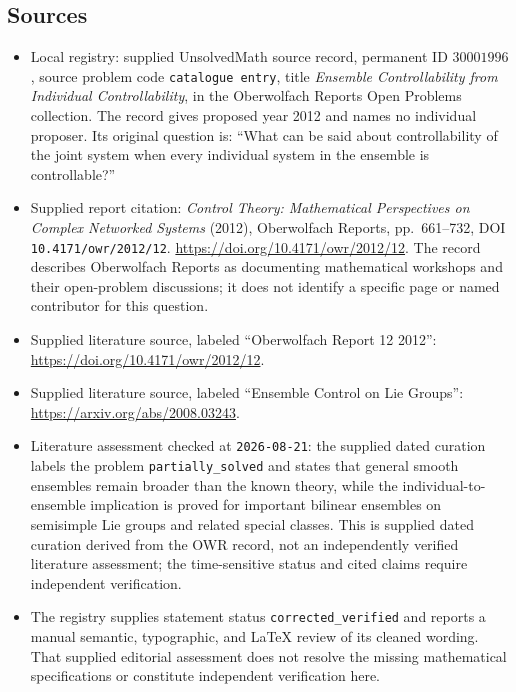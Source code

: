\documentclass[11pt]{article}
\begin{document}
\subsection{Sources}
\begin{itemize}
\item Local registry: supplied UnsolvedMath source record, permanent ID \(30001996\), source problem code \texttt{catalogue entry}, title \emph{Ensemble Controllability from Individual Controllability}, in the Oberwolfach Reports Open Problems collection. The record gives proposed year 2012 and names no individual proposer. Its original question is: ``What can be said about controllability of the joint system when every individual system in the ensemble is controllable?''
\item Supplied report citation: \emph{Control Theory: Mathematical Perspectives on Complex Networked Systems} (2012), Oberwolfach Reports, pp.\ 661--732, DOI \texttt{10.4171/owr/2012/12}. \url{https://doi.org/10.4171/owr/2012/12}. The record describes Oberwolfach Reports as documenting mathematical workshops and their open-problem discussions; it does not identify a specific page or named contributor for this question.
\item Supplied literature source, labeled ``Oberwolfach Report 12 2012'': \url{https://doi.org/10.4171/owr/2012/12}.
\item Supplied literature source, labeled ``Ensemble Control on Lie Groups'': \url{https://arxiv.org/abs/2008.03243}.
\item Literature assessment checked at \texttt{2026-08-21}: the supplied dated curation labels the problem \texttt{partially\_solved} and states that general smooth ensembles remain broader than the known theory, while the individual-to-ensemble implication is proved for important bilinear ensembles on semisimple Lie groups and related special classes. This is supplied dated curation derived from the OWR record, not an independently verified literature assessment; the time-sensitive status and cited claims require independent verification.
\item The registry supplies statement status \texttt{corrected\_verified} and reports a manual semantic, typographic, and LaTeX review of its cleaned wording. That supplied editorial assessment does not resolve the missing mathematical specifications or constitute independent verification here.
\end{itemize}
\end{document}
